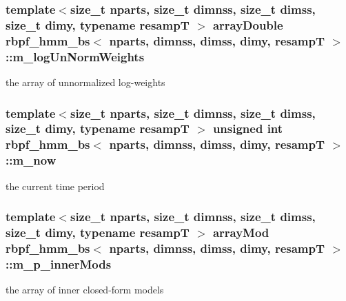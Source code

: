 \subsubsection[{\texorpdfstring{m\+\_\+log\+Un\+Norm\+Weights}{m_logUnNormWeights}}]{\setlength{\rightskip}{0pt plus 5cm}template$<$size\+\_\+t nparts, size\+\_\+t dimnss, size\+\_\+t dimss, size\+\_\+t dimy, typename resampT $>$ {\bf array\+Double} {\bf rbpf\+\_\+hmm\+\_\+bs}$<$ nparts, dimnss, dimss, dimy, resampT $>$\+::m\+\_\+log\+Un\+Norm\+Weights\hspace{0.3cm}{\ttfamily [private]}}\hypertarget{classrbpf__hmm__bs_a6a4c6cd6a2ac836dd74d475560aa4048}{}\label{classrbpf__hmm__bs_a6a4c6cd6a2ac836dd74d475560aa4048}
the array of unnormalized log-\/weights 
\subsubsection[{\texorpdfstring{m\+\_\+now}{m_now}}]{\setlength{\rightskip}{0pt plus 5cm}template$<$size\+\_\+t nparts, size\+\_\+t dimnss, size\+\_\+t dimss, size\+\_\+t dimy, typename resampT $>$ unsigned int {\bf rbpf\+\_\+hmm\+\_\+bs}$<$ nparts, dimnss, dimss, dimy, resampT $>$\+::m\+\_\+now\hspace{0.3cm}{\ttfamily [private]}}\hypertarget{classrbpf__hmm__bs_ae0102fba0fb6873f0d01ef873fe8dbb1}{}\label{classrbpf__hmm__bs_ae0102fba0fb6873f0d01ef873fe8dbb1}
the current time period 
\subsubsection[{\texorpdfstring{m\+\_\+p\+\_\+inner\+Mods}{m_p_innerMods}}]{\setlength{\rightskip}{0pt plus 5cm}template$<$size\+\_\+t nparts, size\+\_\+t dimnss, size\+\_\+t dimss, size\+\_\+t dimy, typename resampT $>$ {\bf array\+Mod} {\bf rbpf\+\_\+hmm\+\_\+bs}$<$ nparts, dimnss, dimss, dimy, resampT $>$\+::m\+\_\+p\+\_\+inner\+Mods\hspace{0.3cm}{\ttfamily [private]}}\hypertarget{classrbpf__hmm__bs_a66e06e277278568dd484b36065ad38ee}{}\label{classrbpf__hmm__bs_a66e06e277278568dd484b36065ad38ee}
the array of inner closed-\/form models 
